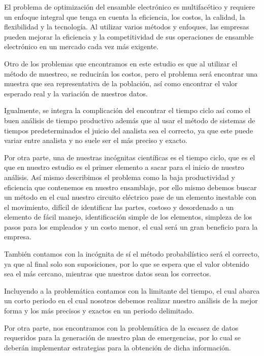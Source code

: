     El problema de optimización del ensamble electrónico es multifacético y requiere un enfoque integral que tenga en cuenta la eficiencia, los costos, la calidad, la flexibilidad y la tecnología. Al utilizar varios métodos y enfoques, las empresas pueden mejorar la eficiencia y la competitividad de sus operaciones de ensamble electrónico en un mercado cada vez más exigente.
    
    Otro de los problemas que encontramos en este estudio es que al utilizar el método de muestreo, se reducirán los costos, pero el problema será encontrar una muestra que sea representativa de la población, así como encontrar el valor esperado real y la variación de nuestros datos.
    
    Igualmente, se integra la complicación del encontrar el tiempo ciclo así como el buen análisis de tiempo productivo además que al usar el método de sistemas de tiempos predeterminados el juicio del analista sea el correcto, ya que este puede variar entre analista y no suele ser el más preciso y exacto.
    
    Por otra parte, una de nuestras incógnitas científicas es el tiempo ciclo, que es el que en nuestro estudio es el primer elemento a sacar para el inicio de nuestro análisis. Así mismo describimos el problema como la baja productividad y eficiencia que contenemos en nuestro ensamblaje, por ello mismo debemos buscar un método en el cual nuestro circuito eléctrico pase de un elemento inestable con el movimiento, difícil de identificar las partes, costoso y desordenado a un elemento de fácil manejo, identificación simple de los elementos, simpleza de los pasos para los empleados y un costo menor, el cual será un gran beneficio para la empresa. 
    
    También contamos con la incógnita de sí el método probabilístico será el correcto, ya que al final solo son suposiciones, por lo que se espera que el valor obtenido sea el más cercano, mientras que nuestros datos sean los correctos.
    
    Incluyendo a la problemática contamos con la limitante del tiempo, el cual abarca un corto periodo en el cual nosotros debemos realizar nuestro análisis de la mejor forma y los más precisos y exactos en un periodo delimitado.
    
    Por otra parte, nos encontramos con la problemática de la escasez de datos requeridos para la generación de nuestro plan de emergencias, por lo cual se deberán implementar estrategias para la obtención de dicha información.
    
